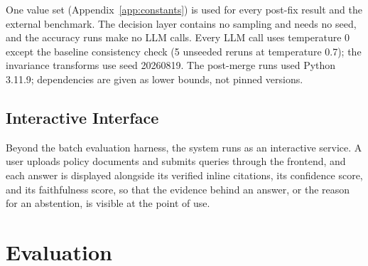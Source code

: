 \documentclass[conference]{IEEEtran}
\begin{document}
One value set (Appendix~\ref{app:constants}) is used for every post-fix
result and the external benchmark. The decision layer contains no sampling
and needs no seed, and the accuracy runs make no LLM calls. Every LLM call
uses temperature 0 except the baseline consistency check (5 unseeded reruns
at temperature 0.7); the invariance transforms use seed 20260819. The
post-merge runs used Python 3.11.9; dependencies are given as lower bounds,
not pinned versions.

\subsection{Interactive Interface}
Beyond the batch evaluation harness, the system runs as an interactive
service. A user uploads policy documents and submits queries through the
frontend, and each answer is displayed alongside its verified inline
citations, its confidence score, and its faithfulness score, so that the
evidence behind an answer, or the reason for an abstention, is visible at
the point of use.

\section{Evaluation}
\label{sec:eval}
\end{document}
